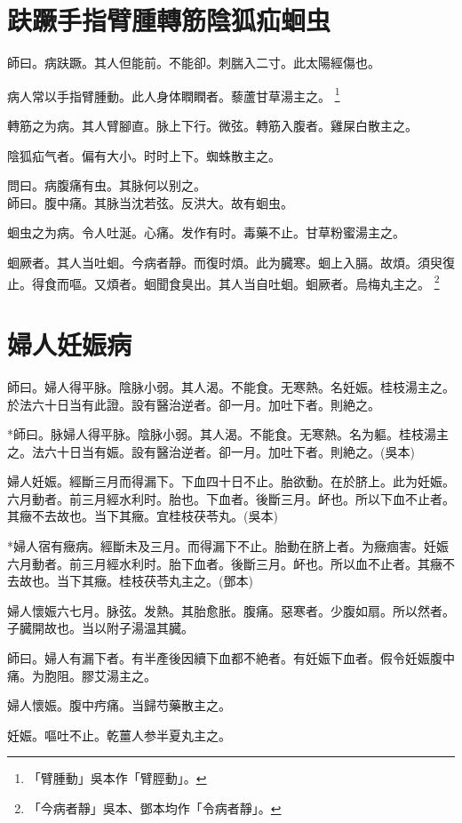 \documentclass[12pt,oneside,UTF8,b5paper]{ctexbook}她她她她她她她
\begin{document}
\chapter{趺蹶手指臂腫轉筋陰狐疝蛔虫}

師曰。病趺蹶。其人但能前。不能卻。刺腨入二寸。此太陽經傷也。

病人常以手指臂腫動。此人身体瞤瞤者。藜蘆甘草湯主之。
	\footnote{「臂腫動」吳本作「臂脛動」。}

轉筋之为病。其人臂腳直。脉上下行。微弦。轉筋入腹者。雞屎白散主之。

陰狐疝气者。偏有大小。时时上下。蜘蛛散主之。

問曰。病腹痛有虫。其脉何以别之。\\
師曰。腹中痛。其脉当沈若弦。反洪大。故有蛔虫。

蛔虫之为病。令人吐涎。心痛。发作有时。毒藥不止。甘草粉蜜湯主之。

蛔厥者。其人当吐蛔。今病者靜。而復时煩。此为臓寒。蛔上入膈。故煩。須臾復止。得食而嘔。又煩者。蛔聞食臭出。其人当自吐蛔。蛔厥者。烏梅丸主之。
	\footnote{「今病者靜」吳本、鄧本均作「令病者靜」。}

\chapter{婦人妊娠病}

師曰。婦人得平脉。陰脉小弱。其人渴。不能食。无寒熱。名妊娠。桂枝湯主之。於法六十日当有此證。設有醫治逆者。卻一月。加吐下者。則絶之。

*師曰。脉婦人得平脉。陰脉小弱。其人渴。不能食。无寒熱。名为軀。桂枝湯主之。法六十日当有娠。設有醫治逆者。卻一月。加吐下者。則絶之。(吳本)

婦人妊娠。經斷三月而得漏下。下血四十日不止。胎欲動。在於脐上。此为妊娠。六月動者。前三月經水利时。胎也。下血者。後斷三月。衃也。所以下血不止者。其癥不去故也。当下其癥。宜桂枝茯苓丸。(吳本)

*婦人宿有癥病。經斷未及三月。而得漏下不止。胎動在脐上者。为癥痼害。妊娠六月動者。前三月經水利时。胎下血者。後斷三月。衃也。所以血不止者。其癥不去故也。当下其癥。桂枝茯苓丸主之。(鄧本)

婦人懷娠六七月。脉弦。发熱。其胎愈胀。腹痛。惡寒者。少腹如扇。所以然者。子臓開故也。当以附子湯温其臓。

師曰。婦人有漏下者。有半產後因續下血都不絶者。有妊娠下血者。假令妊娠腹中痛。为胞阻。膠艾湯主之。

婦人懷娠。腹中㽲痛。当歸芍藥散主之。

妊娠。嘔吐不止。乾薑人参半夏丸主之。
\end{document}
